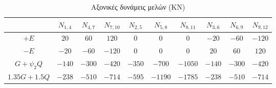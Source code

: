 \begin{landscape}
\begin{table}[h]
\centering\footnotesize
\begin{tabular}{| c || c | c | c | c | c | c | c | c | c |}
\hline
& $N_{1,4}$ & $N_{4,7}$ & $N_{7,10}$ & $N_{2,5}$ & $N_{5,8}$ & $N_{8,11}$ & $N_{3,6}$ & $N_{6,9}$ & $N_{9,12}$ \\
\hline
\hline
$+E$ & $20$ & $60$ & $120$ & $0$ & $0$ & $0$ & $-20$ & $-60$ & $-120$ \\
\hline
$-E$ & $-20$ & $-60$ & $-120$ & $0$ & $0$ & $0$ & $20$ & $60$ & $120$ \\
\hline
$G+\psi_2 Q$ & $-140$ & $-300$ & $-420$ & $-350$ & $-700$ & $-1050$ & $-140$ & $-300$ & $-420$ \\
\hline
$1.35G+1.5Q$ & $-238$ & $-510$ & $-714$ & $-595$ & $-1190$ & $-1785$ & $-238$ & $-510$ & $-714$ \\
\hline
\end{tabular}
\caption{Αξονικές δυνάμεις μελών (\textlatin{KN})}
\label{tab:axialloads}
\end{table}

\end{landscape}
